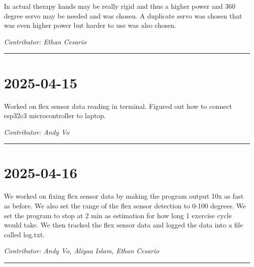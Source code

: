\documentclass[12pt]{article}
\begin{document}
In actual therapy hands may be really rigid and thus a higher power and 360 degree servo may be needed and was chosen. A duplicate servo was chosen that was even higher power but harder to use was also chosen.

\vspace{1em}
\noindent\textit{Contributor: Ethan Cesario}
\vspace{1em}
\hrule


\section*{2025-04-15}
Worked on flex sensor data reading in terminal. Figured out how to connect esp32c3 microcontroller to laptop.


\vspace{1em}
\noindent\textit{Contributor: Andy Vo}
\vspace{1em}
\hrule

\section*{2025-04-16}
We worked on fixing flex sensor data by making the program output 10x as fast as before. We also set the range of the flex sensor detection to 0-100 degrees. 
We set the program to stop at 2 min as estimation for how long 1 exercise cycle would take. We then tracked the flex sensor data and logged the data into a file called log.txt.


\vspace{1em}
\noindent\textit{Contributor: Andy Vo, Aliyaa Islam, Ethan Cesario}
\vspace{1em}
\hrule
\end{document}
